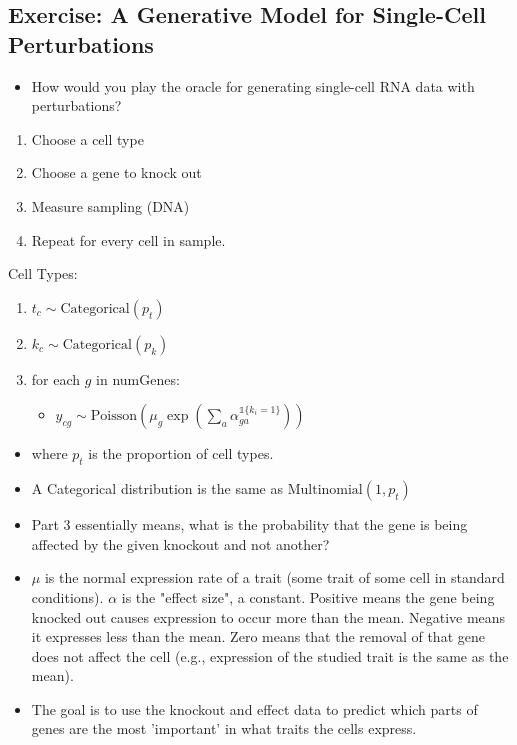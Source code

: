 \documentclass[10pt]{article}
\begin{document}
\subsection*{Exercise: A Generative Model for Single-Cell Perturbations}
\begin{itemize}
    \item How would you play the oracle for generating single-cell RNA data with perturbations?
\end{itemize}
\begin{enumerate}
    \item Choose a cell type
    \item Choose a gene to knock out
    \item Measure sampling (DNA)
    \item Repeat for every cell in sample.
\end{enumerate}

Cell Types:
\begin{enumerate}
    \item $t_c \sim \text{Categorical}(p_t)$
    \item $k_c \sim \text{Categorical}(p_k)$
    \item for each $g$ in numGenes:
    \begin{itemize}
        \item $y_{cg} \sim \text{Poisson}(\mu_g \exp(\sum_a \alpha_{ga}^{\mathds{1}\{k_i = 1\}}))$
    \end{itemize}
\end{enumerate}
\begin{itemize}
    \item where $p_t$ is the proportion of cell types.
    \item A Categorical distribution is the same as $\text{Multinomial}(1, p_t)$
    \item Part 3 essentially means, what is the probability that the gene is being affected by the given knockout and not another?
    \item $\mu$ is the normal expression rate of a trait (some trait of some cell in standard conditions).  $\alpha$ is the "effect size", a constant.  Positive means the gene being knocked out causes expression to occur more than the mean. Negative means it expresses less than the mean.  Zero means that the removal of that gene does not affect the cell (e.g., expression of the studied trait is the same as the mean).
    \item The goal is to use the knockout and effect data to predict which parts of genes are the most 'important' in what traits the cells express.
\end{itemize}
\end{document}
